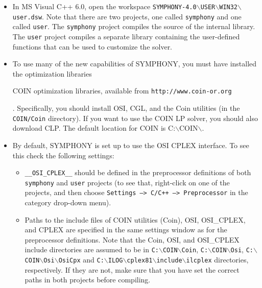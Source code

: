 \begin{itemize}

\item In MS Visual C++ 6.0, open the workspace
\texttt{SYMPHONY-4.0$\backslash$USER$\backslash$WIN32$\backslash$user.dsw}. 
Note that there are two projects, one called \texttt{symphony} and one called
\texttt{user}.  The \texttt{symphony} project compiles the source of the internal
library. The \texttt{user} project compiles a separate library containing the
user-defined functions that can be used to customize the solver.

\item To use many of the new capabilities of SYMPHONY, you must have installed
the  optimization
libraries 
\begin{latexonly} 
COIN optimization libraries, available from
\texttt{http://www.coin-or.org} 
\end{latexonly}. Specifically, you should
install OSI, CGL, and the Coin utilities (in the \texttt{COIN/Coin}
directory). If you want to use the COIN LP solver, you should also download
CLP. The default location for COIN is C:$\backslash$COIN$\backslash$.

\item By default, SYMPHONY is set up to use the OSI CPLEX interface. To see this
check the following settings:

\begin{itemize}

\item \texttt{\_\_OSI\_CPLEX\_\_} should be defined in the preprocessor
definitions of both \texttt{symphony} and \texttt{user} projects (to see that,
right-click on one of the projects, and then choose \texttt{Settings --> C/C++
--> Preprocessor} in the category drop-down menu).

\item Paths to the include files of COIN utilities (Coin), OSI, OSI\_CPLEX, and
CPLEX are specified in the same settings window as for the preprocessor
definitions. Note that the Coin, OSI, and OSI\_CPLEX include directories are
assumed to be in \texttt{C:$\backslash$COIN$\backslash$Coin},
\texttt{C:$\backslash$COIN$\backslash$Osi},
\texttt{C:$\backslash$COIN$\backslash$Osi$\backslash$OsiCpx} and 
\texttt{C:$\backslash$ILOG$\backslash$cplex81$\backslash$include$\backslash$ilcplex}
directories, respectively. If they are not, make sure that you have set the
correct paths in both projects before compiling.


\end{itemize}
\end{itemize}
